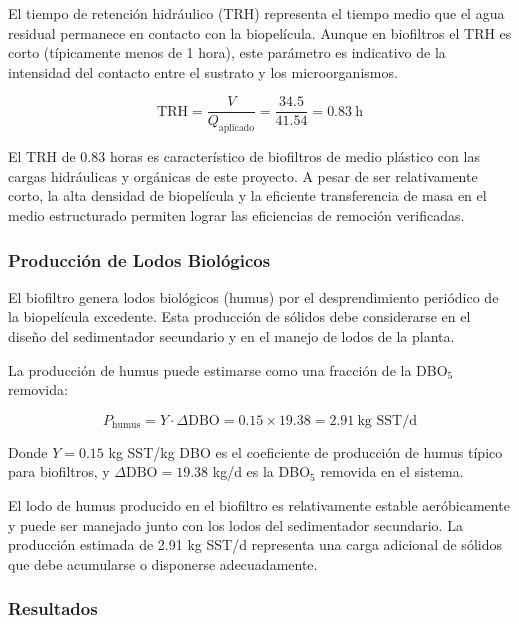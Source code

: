 \documentclass[12pt,a4paper]{article}
\begin{document}
El tiempo de retención hidráulico (TRH) representa el tiempo medio que el agua residual permanece en contacto con la biopelícula. Aunque en biofiltros el TRH es corto (típicamente menos de 1 hora), este parámetro es indicativo de la intensidad del contacto entre el sustrato y los microorganismos.

\begin{equation}
\text{TRH} = \frac{V}{Q_{\text{aplicado}}} = \frac{34.5}{41.54} = 0.83\ \text{h}
\end{equation}

El TRH de 0.83 horas es característico de biofiltros de medio plástico con las cargas hidráulicas y orgánicas de este proyecto. A pesar de ser relativamente corto, la alta densidad de biopelícula y la eficiente transferencia de masa en el medio estructurado permiten lograr las eficiencias de remoción verificadas.

\subsubsection*{Producción de Lodos Biológicos}

El biofiltro genera lodos biológicos (humus) por el desprendimiento periódico de la biopelícula excedente. Esta producción de sólidos debe considerarse en el diseño del sedimentador secundario y en el manejo de lodos de la planta.

La producción de humus puede estimarse como una fracción de la DBO$_5$ removida:

\begin{equation}
P_{\text{humus}} = Y \cdot \Delta\text{DBO} = 0.15 \times 19.38 = 2.91\ \text{kg SST/d}
\end{equation}

Donde $Y = 0.15$ kg SST/kg DBO es el coeficiente de producción de humus típico para biofiltros, y $\Delta\text{DBO} = 19.38$ kg/d es la DBO$_5$ removida en el sistema.

El lodo de humus producido en el biofiltro es relativamente estable aeróbicamente y puede ser manejado junto con los lodos del sedimentador secundario. La producción estimada de 2.91 kg SST/d representa una carga adicional de sólidos que debe acumularse o disponerse adecuadamente.

\subsubsection{Resultados}
\end{document}
